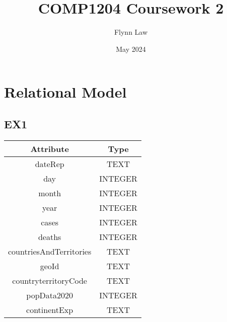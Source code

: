 \documentclass{article}
\title{COMP1204 Coursework 2}
\author{Flynn Law}
\date{May 2024}
\begin{document}
\newpage

\maketitle

\section{Relational Model}
\subsection{EX1}
\begin{longtable}{|c|c|}
\hline
\textbf{Attribute} & \textbf{Type} \\
\hline
dateRep & TEXT \\
day & INTEGER \\
month & INTEGER \\
year & INTEGER \\
cases & INTEGER \\
deaths & INTEGER \\
countriesAndTerritories & TEXT \\
geoId & TEXT \\
countryterritoryCode & TEXT \\
popData2020 & INTEGER \\
continentExp & TEXT \\
\hline
\end{longtable}
\end{document}

